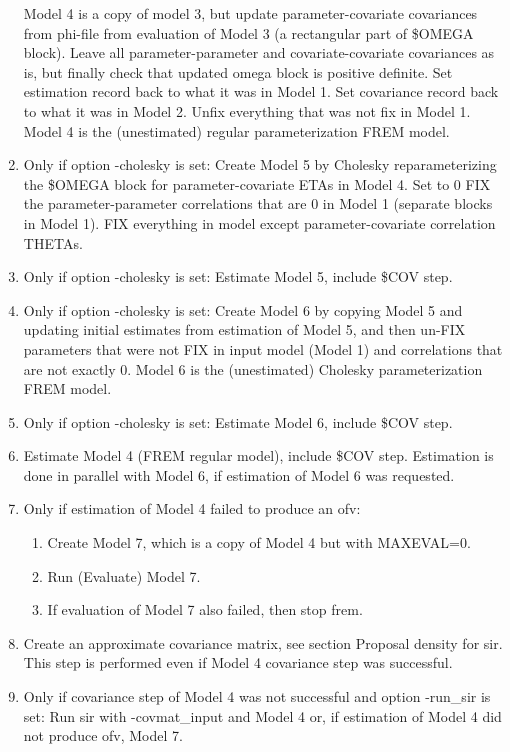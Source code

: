 \begin{enumerate}
Model 4 is a copy of model 3, but update parameter-covariate covariances from phi-file from evaluation of Model 3
(a rectangular part of \$OMEGA block).
Leave all parameter-parameter and covariate-covariate covariances as is, but
finally check that updated omega block is positive definite.
Set estimation record back to what it was in Model 1.
Set covariance record back to what it was in Model 2.
Unfix everything that was not fix in Model 1.
Model 4 is the (unestimated) regular parameterization FREM model.
\item
Only if option -cholesky is set: Create Model 5 by
Cholesky reparameterizing the \$OMEGA block
for parameter-covariate ETAs in Model 4.
Set to 0 FIX the parameter-parameter correlations that are 0 in Model 1 (separate blocks in Model 1).
FIX everything in model except parameter-covariate correlation THETAs.
\item Only if option -cholesky is set: Estimate Model 5, include \$COV step.
\item Only if option -cholesky is set: Create Model 6
by copying Model 5 and updating initial estimates from
estimation of Model 5, and then un-FIX parameters that
were not FIX in input model (Model 1) and correlations that are not exactly 0.
Model 6 is the (unestimated) Cholesky parameterization FREM model.
\item Only if option -cholesky is set:
Estimate Model 6, include \$COV step.
\item %
Estimate Model 4 (FREM regular model), include \$COV step.
Estimation is done in parallel with Model 6, if estimation of Model 6 was requested.
\item Only if estimation of Model 4 failed to produce an ofv:
\begin{enumerate}
\item Create Model 7, which is a copy of Model 4 but with MAXEVAL=0.
\item Run (Evaluate) Model 7.
\item If evaluation of Model 7 also failed, then stop frem.
\end{enumerate}
\item Create an approximate covariance matrix, see section Proposal density for sir.
This step is performed even if Model 4 covariance step was successful.
\item Only if covariance step of Model 4 was not successful and option -run\_sir is set:
Run sir with -covmat\_input and Model 4 or, if estimation of Model 4 did not produce ofv, Model 7.
\end{enumerate}



